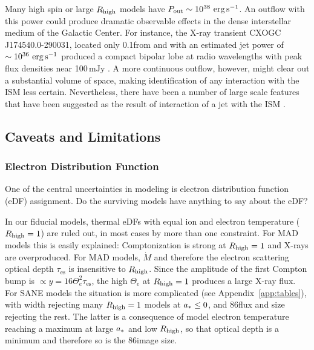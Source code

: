 Many high spin or large $R_\mathrm{high}$ models have $P_\mathrm{out} \sim 10^{38} \,\,\mathrm{erg}\,\mathrm{s}^{-1}$.
An outflow with this power could produce dramatic observable effects in the dense interstellar medium of the Galactic Center.
For instance, the X-ray transient CXOGC J174540.0-290031, located only 0.1\pc from \sgra and with an estimated jet power of $\sim 10^{36}\,\,\mathrm{erg}\,\mathrm{s}^{-1}$ produced a compact bipolar lobe at radio wavelengths with peak flux densities near 100$\,\mathrm{mJy}$ \citep{2005ApJ...633..218B}.
A more continuous  outflow, however, might clear out a substantial volume of space, making identification of any interaction with the ISM less certain.
Nevertheless, there have been a number of large scale features that have been suggested as the result of interaction of a jet with the ISM \citep[e.g.,][]{2013ApJ...779..154L,2021ApJ...922..254C}.

\subsection{Caveats and Limitations}\label{sec:limits}

\subsubsection{Electron Distribution Function}

One of the central uncertainties in modeling \sgra is electron distribution function (eDF) assignment.
Do the surviving models have anything to say about the eDF?

In our fiducial models, thermal eDFs with equal ion and electron temperature ($R_\mathrm{high} = 1$) are ruled out, in most cases by more than one constraint.
For MAD models this is easily explained: Comptonization is strong at $R_\mathrm{high} = 1$ and X-rays are overproduced.
For MAD models, $\dot{M}$ and therefore the electron scattering optical depth $\tau_\mathrm{es}$ is insensitive to $R_\mathrm{high}$.
Since the amplitude of the first Compton bump is $\propto y = 16 \Theta_e^2 \tau_\mathrm{es}$, the high $\Theta_e$ at $R_\mathrm{high} = 1$ produces a large X-ray flux.
For SANE models the situation is more complicated (see Appendix~\ref{app:tables}), with \mring width rejecting many $R_\mathrm{high} = 1$ models at $a_* \le 0$, and 86\GHz flux and size rejecting the rest.
The latter is a consequence of model electron temperature reaching a maximum at large $a_*$ and low $R_\mathrm{high}$, so that optical depth is a minimum and therefore so is the 86\GHz image size.

